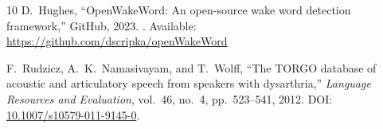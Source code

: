 \documentclass[10pt,twocolumn,a4paper]{article}
\begin{document}
\begin{thebibliography}{10}
D.~Hughes,
``OpenWakeWord: An open-source wake word detection framework,''
GitHub, 2023.
\newblock [Online]. Available: \url{https://github.com/dscripka/openWakeWord}

F.~Rudzicz, A.~K.~Namasivayam, and T.~Wolff,
``The TORGO database of acoustic and articulatory speech from speakers with
dysarthria,''
\textit{Language Resources and Evaluation}, vol.~46, no.~4,
pp.~523--541, 2012.
\newblock DOI: \href{https://doi.org/10.1007/s10579-011-9145-0}{10.1007/s10579-011-9145-0}.

\end{thebibliography}

\newpage
\onecolumn
\printglossary[type=\acronymtype, title=List of Acronyms,
               toctitle=List of Acronyms]
\printglossary[title=Terminology, toctitle=Terminology]
\end{document}
